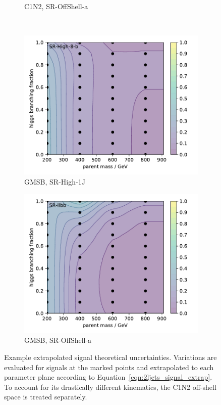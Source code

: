 \begin{figure}[tp]
\begin{subfigure}{0.495\textwidth}
\caption{C1N2, SR-OffShell-a}
\end{subfigure}
\\[0.5em]
\begin{subfigure}{0.495\textwidth}
\centering
\includegraphics[width=\textwidth]{figures/2ljets_signal_sys_gmsb_SRHigh8_2.pdf}
\caption{GMSB, SR-High-1J}
\end{subfigure}
\hfill
\begin{subfigure}{0.495\textwidth}
\centering
\includegraphics[width=\textwidth]{figures/2ljets_signal_sys_gmsb_SRllbb.pdf}
\caption{GMSB, SR-OffShell-a}
\end{subfigure}
\caption[
Example extrapolated signal theoretical uncertainties
]{%
Example extrapolated signal theoretical uncertainties.
Variations are evaluated for signals at the marked points and extrapolated to
each parameter plane according to Equation~\ref{eqn:2ljets_signal_extrap}.
To account for its drastically different kinematics, the C1N2 off-shell space
is treated separately.
}
\label{fig:2ljets_signal_sys_extrap}
\end{figure}

